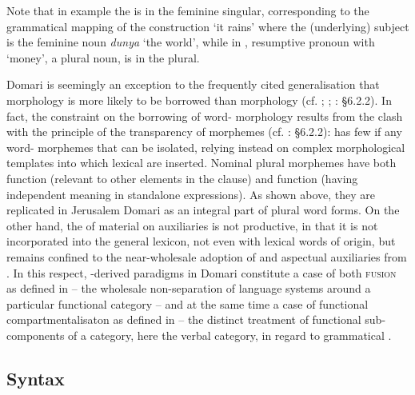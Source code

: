 \documentclass[output=paper]{langsci/langscibook}
\begin{document}
Note that in example  the  is in the feminine singular, corresponding to the grammatical mapping of the   construction ‘it rains’ where the (underlying) subject is the feminine noun \textit{dunya} ‘the world’, while in , resumptive pronoun  with ‘money’, a plural noun, is in the plural.

Domari is seemingly an exception to the frequently cited generalisation that  morphology is more likely to be borrowed than  morphology (cf. \citealt{Moravcsik1978}; \citealt{Field2002}; \citealt{Matras2009}: §6.2.2). In fact, the constraint on the borrowing of word- morphology results from the clash with the principle of the transparency of morphemes (cf. \citealt{Matras2009}: §6.2.2):  has few if any word- morphemes that can be isolated, relying instead on complex morphological templates into which lexical  are inserted. Nominal plural morphemes have both  function (relevant to other elements in the clause) and  function (having independent meaning in standalone expressions). As shown above, they are replicated in Jerusalem Domari as an integral part of  plural word forms. On the other hand, the  of  material on auxiliaries is not productive, in that it is not incorporated into the general lexicon, not even with lexical words of  origin, but remains confined to the near-wholesale adoption of  and aspectual auxiliaries from . In this respect, -derived  paradigms in Domari constitute a case of both \textsc{fusion} as defined in \citet{Matras2009} – the wholesale non-separation of language systems around a particular functional category – and at the same time a case of functional compartmentalisaton as defined in \citet{Matras2015} – the distinct treatment of functional sub-components of a category, here the verbal category, in regard to grammatical . 

\subsection{Syntax}
\end{document}
